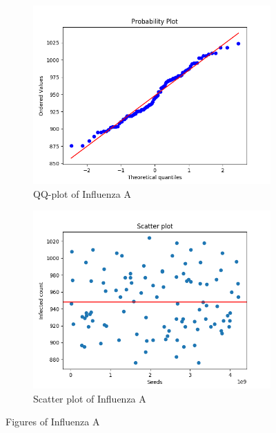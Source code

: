 \documentclass[a4paper]{article}
\begin{document}
\begin{figure}[H]
\begin{subfigure}{.5\textwidth}
  \centering
  \includegraphics[width=1\linewidth]{Influenza_A/Influenza_A-qqplot.png}
  \caption{QQ-plot of Influenza A}
  \label{fig:QQ-plot_Influenza_A}
\end{subfigure}%
\begin{subfigure}{.5\textwidth}
  \centering
  \includegraphics[width=1\linewidth]{Influenza_A/Influenza_A-scatterplot.png}
  \caption{Scatter plot of Influenza A}
  \label{fig:scatterplot_Influenza_A}
\end{subfigure}
\caption{Figures of Influenza A}
\label{fig:Influenza_A }
\end{figure}
\pagebreak
\end{document}
